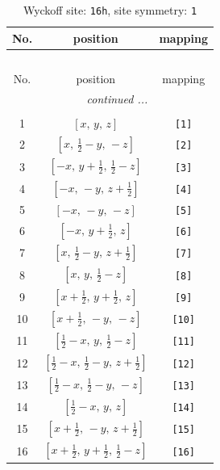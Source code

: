 \documentclass[fleqn,8pt]{jsarticle}
\begin{document}
\begin{longtable}{ccc}
\caption{Wyckoff site: {\tt 16h}, site symmetry: {\tt 1}}
 \\
 \hline \hline
No. & position & mapping \\ \hline \endfirsthead

\multicolumn{2}{l}{\tablename\ \thetable{}} \\
 \hline \hline
No. & position & mapping \\ \hline \endhead

 \hline \hline
\multicolumn{2}{r}{\footnotesize\it continued ...} \\ \endfoot

 \hline \hline
\multicolumn{2}{r}{} \\ \endlastfoot

1 & $\left[ x,\, y,\, z \right]$ & {\tt [1]} \\ \hline
2 & $\left[ x,\, \frac{1}{2} - y,\, - z \right]$ & {\tt [2]} \\ \hline
3 & $\left[ - x,\, y + \frac{1}{2},\, \frac{1}{2} - z \right]$ & {\tt [3]} \\ \hline
4 & $\left[ - x,\, - y,\, z + \frac{1}{2} \right]$ & {\tt [4]} \\ \hline
5 & $\left[ - x,\, - y,\, - z \right]$ & {\tt [5]} \\ \hline
6 & $\left[ - x,\, y + \frac{1}{2},\, z \right]$ & {\tt [6]} \\ \hline
7 & $\left[ x,\, \frac{1}{2} - y,\, z + \frac{1}{2} \right]$ & {\tt [7]} \\ \hline
8 & $\left[ x,\, y,\, \frac{1}{2} - z \right]$ & {\tt [8]} \\ \hline
9 & $\left[ x + \frac{1}{2},\, y + \frac{1}{2},\, z \right]$ & {\tt [9]} \\ \hline
10 & $\left[ x + \frac{1}{2},\, - y,\, - z \right]$ & {\tt [10]} \\ \hline
11 & $\left[ \frac{1}{2} - x,\, y,\, \frac{1}{2} - z \right]$ & {\tt [11]} \\ \hline
12 & $\left[ \frac{1}{2} - x,\, \frac{1}{2} - y,\, z + \frac{1}{2} \right]$ & {\tt [12]} \\ \hline
13 & $\left[ \frac{1}{2} - x,\, \frac{1}{2} - y,\, - z \right]$ & {\tt [13]} \\ \hline
14 & $\left[ \frac{1}{2} - x,\, y,\, z \right]$ & {\tt [14]} \\ \hline
15 & $\left[ x + \frac{1}{2},\, - y,\, z + \frac{1}{2} \right]$ & {\tt [15]} \\ \hline
16 & $\left[ x + \frac{1}{2},\, y + \frac{1}{2},\, \frac{1}{2} - z \right]$ & {\tt [16]} \\
\end{longtable}
\end{document}
